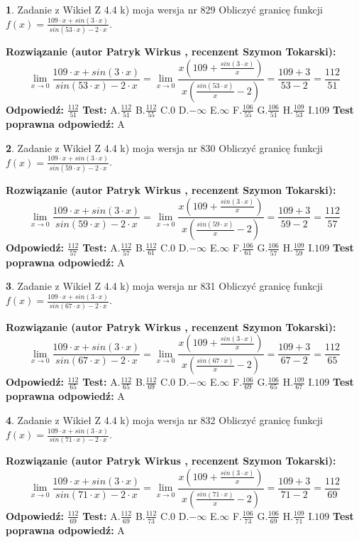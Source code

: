 \documentclass[12pt, a4paper]{article}
\theoremstyle{definition} %
\newtheorem{zad}{}
\newcommand{\zadStart}[1]{\begin{zad}#1\newline}
\newcommand{\zadStop}{\end{zad}}
\newcommand{\rozwStart}[2]{\noindent \textbf{Rozwiązanie (autor #1 , recenzent #2): }\newline}
\newcommand{\rozwStop}{\newline}
\newcommand{\odpStart}{\noindent \textbf{Odpowiedź:}\newline}
\newcommand{\odpStop}{\newline}
\newcommand{\testStart}{\noindent \textbf{Test:}\newline}
\newcommand{\testStop}{\newline}
\newcommand{\kluczStart}{\noindent \textbf{Test poprawna odpowiedź:}\newline}
\newcommand{\kluczStop}{\newline}
\begin{document}
\zadStart{Zadanie z Wikieł Z 4.4 k) moja wersja nr 829}
Obliczyć granicę funkcji $f(x)=\frac{109\cdot x +sin(3\cdot x)}{sin(53\cdot x) -2\cdot x}$.
\zadStop
\rozwStart{Patryk Wirkus}{Szymon Tokarski}
$$\lim\limits_{x\to 0}\frac{109\cdot x +sin(3\cdot x)}{sin(53\cdot x) -2\cdot x}
=\lim\limits_{x\to 0}\frac{x(109+\frac{sin(3\cdot x)}{x})}{x(\frac{sin(53\cdot x)}{x}-2)}
=\frac{109+3}{53-2} = \frac{112}{51}$$
\rozwStop
\odpStart
$\frac{112}{51}$
\odpStop
\testStart
A.$\frac{112}{51}$
B.$\frac{112}{55}$
C.$0$
D.$-\infty$
E.$\infty$
F.$\frac{106}{55}$
G.$\frac{106}{51}$
H.$\frac{109}{53}$
I.$109$
\testStop
\kluczStart
A
\kluczStop



\zadStart{Zadanie z Wikieł Z 4.4 k) moja wersja nr 830}
Obliczyć granicę funkcji $f(x)=\frac{109\cdot x +sin(3\cdot x)}{sin(59\cdot x) -2\cdot x}$.
\zadStop
\rozwStart{Patryk Wirkus}{Szymon Tokarski}
$$\lim\limits_{x\to 0}\frac{109\cdot x +sin(3\cdot x)}{sin(59\cdot x) -2\cdot x}
=\lim\limits_{x\to 0}\frac{x(109+\frac{sin(3\cdot x)}{x})}{x(\frac{sin(59\cdot x)}{x}-2)}
=\frac{109+3}{59-2} = \frac{112}{57}$$
\rozwStop
\odpStart
$\frac{112}{57}$
\odpStop
\testStart
A.$\frac{112}{57}$
B.$\frac{112}{61}$
C.$0$
D.$-\infty$
E.$\infty$
F.$\frac{106}{61}$
G.$\frac{106}{57}$
H.$\frac{109}{59}$
I.$109$
\testStop
\kluczStart
A
\kluczStop



\zadStart{Zadanie z Wikieł Z 4.4 k) moja wersja nr 831}
Obliczyć granicę funkcji $f(x)=\frac{109\cdot x +sin(3\cdot x)}{sin(67\cdot x) -2\cdot x}$.
\zadStop
\rozwStart{Patryk Wirkus}{Szymon Tokarski}
$$\lim\limits_{x\to 0}\frac{109\cdot x +sin(3\cdot x)}{sin(67\cdot x) -2\cdot x}
=\lim\limits_{x\to 0}\frac{x(109+\frac{sin(3\cdot x)}{x})}{x(\frac{sin(67\cdot x)}{x}-2)}
=\frac{109+3}{67-2} = \frac{112}{65}$$
\rozwStop
\odpStart
$\frac{112}{65}$
\odpStop
\testStart
A.$\frac{112}{65}$
B.$\frac{112}{69}$
C.$0$
D.$-\infty$
E.$\infty$
F.$\frac{106}{69}$
G.$\frac{106}{65}$
H.$\frac{109}{67}$
I.$109$
\testStop
\kluczStart
A
\kluczStop



\zadStart{Zadanie z Wikieł Z 4.4 k) moja wersja nr 832}
Obliczyć granicę funkcji $f(x)=\frac{109\cdot x +sin(3\cdot x)}{sin(71\cdot x) -2\cdot x}$.
\zadStop
\rozwStart{Patryk Wirkus}{Szymon Tokarski}
$$\lim\limits_{x\to 0}\frac{109\cdot x +sin(3\cdot x)}{sin(71\cdot x) -2\cdot x}
=\lim\limits_{x\to 0}\frac{x(109+\frac{sin(3\cdot x)}{x})}{x(\frac{sin(71\cdot x)}{x}-2)}
=\frac{109+3}{71-2} = \frac{112}{69}$$
\rozwStop
\odpStart
$\frac{112}{69}$
\odpStop
\testStart
A.$\frac{112}{69}$
B.$\frac{112}{73}$
C.$0$
D.$-\infty$
E.$\infty$
F.$\frac{106}{73}$
G.$\frac{106}{69}$
H.$\frac{109}{71}$
I.$109$
\testStop
\kluczStart
A
\kluczStop
\end{document}
